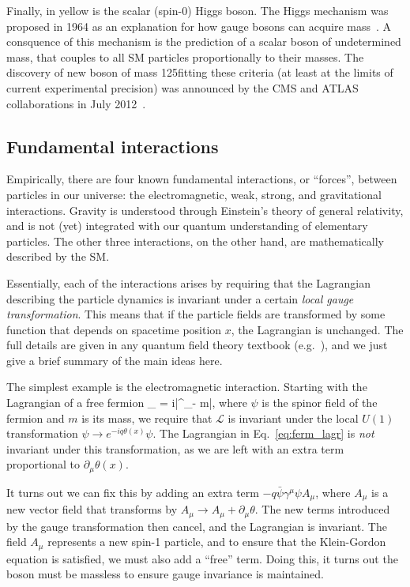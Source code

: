 Finally, in yellow is the scalar (spin-0) Higgs boson. The Higgs mechanism was proposed in 1964 as an explanation
for how gauge bosons can acquire mass~\cite{Englert,Higgs,Guralnik}. A consquence of this mechanism is the prediction of a
scalar boson of undetermined mass, that couples to all SM particles proportionally to their masses.
The discovery of new boson of mass 125\GeV fitting these criteria (at least at the limits of current experimental precision) 
was announced by the CMS and ATLAS collaborations in July 2012~\cite{ATLAS:higgs,CMS:higgs}.

\subsection{Fundamental interactions}

Empirically, there are four known fundamental interactions, or ``forces'', between particles in our universe: 
the electromagnetic, weak, strong, and gravitational interactions. Gravity is understood
through Einstein's theory of general relativity, and is not (yet) integrated with our quantum understanding
of elementary particles. The other three interactions, on the other hand, are mathematically described by the
SM.

Essentially, each of the interactions arises by requiring that the Lagrangian describing the particle dynamics is
invariant under a certain \textit{local gauge transformation}. This means that if the particle fields are transformed
by some function that depends on spacetime position $x$, the Lagrangian is unchanged.
The full details are given in any quantum field theory textbook (e.g.~\cite{Peskin}), and we just give a brief
summary of the main ideas here.

The simplest example is the electromagnetic interaction. Starting with the Lagrangian of a free fermion
\be\label{eq:ferm_lagr}
_ = i\bar{\psi}\gamma^\mu\partial_\mu\psi - m\bar{\psi}\psi,
\ee
where $\psi$ is the spinor field of the fermion and $m$ is its mass,
we require that $\mathcal{L}$ is invariant under the local $U(1)$ transformation $\psi\to e^{-iq\theta(x)}\psi$.
The Lagrangian in Eq.~\ref{eq:ferm_lagr} is \textit{not} invariant under this transformation,
as we are left with an extra term proportional to $\partial_\mu\theta(x)$.

It turns out we can fix this by adding an extra term $-q\bar{\psi}\gamma^\mu\psi A_\mu$, where
$A_\mu$ is a new vector field that transforms by $A_\mu\to A_\mu+\partial_\mu\theta$. The new terms
introduced by the gauge transformation then cancel, and the Lagrangian is invariant.  The field
$A_\mu$ represents a new spin-1 particle, and to ensure that the Klein-Gordon equation is satisfied,
we must also add a ``free'' term. Doing this, it turns out the boson must be massless to ensure gauge invariance is
maintained.

